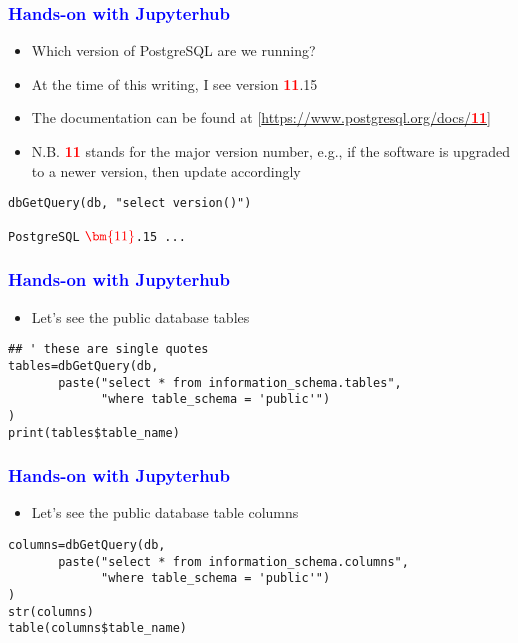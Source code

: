 \documentclass[11pt,pdftex,dvipsnames,usenames]{beamer}
\begin{document}
\begin{frame}[fragile]\frametitle{\bf\textcolor{blue}{Hands-on with Jupyterhub}}
\begin{itemize}
\item Which version of PostgreSQL are we running?
\item At the time of this writing, I see version \textbf{\textcolor{red}{11}}.15
\item The documentation can be found at
\textcolor{PineGreen}{[\href{https://www.postgresql.org/docs/11}
{https://www.postgresql.org/docs/\textbf{\textcolor{red}{11}}}]}
\item N.B. \textbf{\textcolor{red}{11}} stands for the major version number, e.g.,
if the software is upgraded to a newer version, then update accordingly
\end{itemize}
\begin{verbatim}
dbGetQuery(db, "select version()")
\end{verbatim}
\texttt{PostgreSQL} $\textcolor{red}{\bm{11}}$\texttt{.15 ...}
\end{frame}

\begin{frame}[fragile]\frametitle{\bf\textcolor{blue}{Hands-on with Jupyterhub}}
\begin{itemize}
\item Let's see the public database tables
\end{itemize}
\begin{verbatim}
## ' these are single quotes 
tables=dbGetQuery(db, 
       paste("select * from information_schema.tables",
             "where table_schema = 'public'")
)
print(tables$table_name)
\end{verbatim}
\end{frame}

\begin{frame}[fragile]\frametitle{\bf\textcolor{blue}{Hands-on with Jupyterhub}}
\begin{itemize}
\item Let's see the public database table columns
\end{itemize}
\begin{verbatim}
columns=dbGetQuery(db, 
       paste("select * from information_schema.columns",
             "where table_schema = 'public'")
)
str(columns)
table(columns$table_name)
\end{verbatim}
\end{frame}
\end{document}

